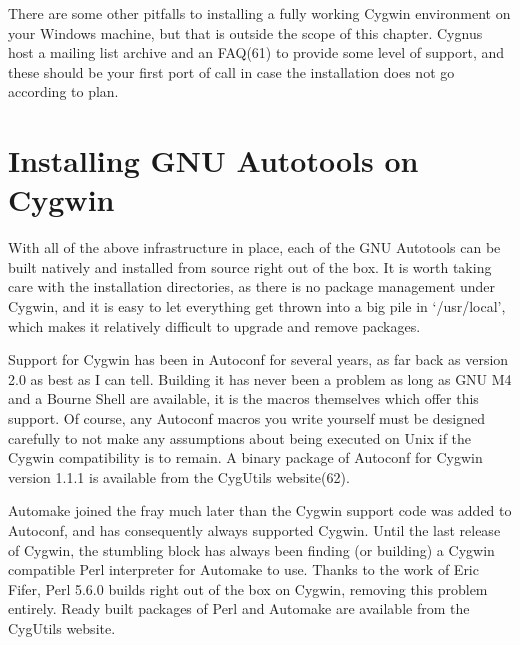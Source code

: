 There are some other pitfalls to installing a fully working Cygwin environment on your Windows machine, but that is outside the scope of this chapter. Cygnus host a mailing list archive and an FAQ(61) to provide some level of support, and these should be your first port of call in case the installation does not go according to plan.

\section{Installing GNU Autotools on Cygwin }

With all of the above infrastructure in place, each of the GNU Autotools can be built natively and installed from source right out of the box. It is worth taking care with the installation directories, as there is no package management under Cygwin, and it is easy to let everything get thrown into a big pile in `/usr/local', which makes it relatively difficult to upgrade and remove packages. 

Support for Cygwin has been in Autoconf for several years, as far back as version 2.0 as best as I can tell. Building it has never been a problem as long as GNU M4 and a Bourne Shell are available, it is the macros themselves which offer this support. Of course, any Autoconf macros you write yourself must be designed carefully to not make any assumptions about being executed on Unix if the Cygwin compatibility is to remain. A binary package of Autoconf for Cygwin version 1.1.1 is available from the CygUtils website(62). 

Automake joined the fray much later than the Cygwin support code was added to Autoconf, and has consequently always supported Cygwin. Until the last release of Cygwin, the stumbling block has always been finding (or building) a Cygwin compatible Perl interpreter for Automake to use. Thanks to the work of Eric Fifer, Perl 5.6.0 builds right out of the box on Cygwin, removing this problem entirely. Ready built packages of Perl and Automake are available from the CygUtils website. 

